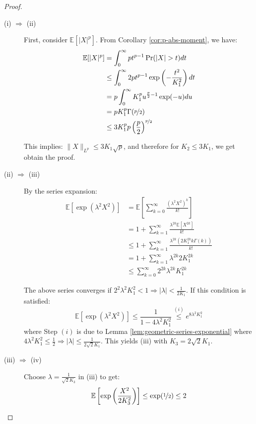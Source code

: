 \documentclass{article}
\theoremstyle{remark}
\newcommand{\Exp}{\mathbb{E}}
\begin{document}
\begin{proof}
\begin{description}
\item [(i) \(\Rightarrow\) (ii)] First, consider \(\Exp[|X|^{p}]\). From Corollary \ref{cor:p-abs-moment}, we have:
\begin{align*}
\Exp[|X|^{p}] &= \int_{0}^{\infty} pt^{p-1} \Pr(|X| > t) dt \\
&\leq \int_{0}^{\infty} 2pt^{p-1} \exp\left(-\frac{t^{2}}{K_{1}^{2}}\right) dt \\
&= p \int_{0}^{\infty} K_{1}^{p}u^{\frac{p}{2} - 1} \exp(-u) du \\
&= p K_{1}^{p} \Gamma(\nicefrac{p}{2}) \\
&\leq 3K_{1}^{p}p\left(\frac{p}{2}\right)^{\nicefrac{p}{2}}
\end{align*}

This implies: \(\|X\|_{L^{p}} \leq 3K_{1}\sqrt{p}\), and therefore for \(K_{2} \leq 3K_{1}\), we get obtain the proof.

\item [(ii) \(\Rightarrow\) (iii)] By the series expansion:
\begin{align*}
\Exp\left[\exp(\lambda^{2}X^{2})\right] &= \Exp\left[\sum_{k=0}^{\infty} \frac{(\lambda^{2}X^{2})^{k}}{k!}\right] \\
&= 1 + \sum_{k=1}^{\infty} \frac{\lambda^{2k}\Exp[X^{2k}]}{k!} \\
&\leq 1 + \sum_{k=1}^{\infty} \frac{\lambda^{2k}(2K_{1}^{2k}k\Gamma(k))}{k!} \\
&= 1 + \sum_{k=1}^{\infty} \lambda^{2k}2K_{1}^{2k} \\
&\leq \sum_{k=0}^{\infty} 2^{2k}\lambda^{2k}K_{1}^{2k}
\end{align*}

The above series converges if \(2^{2}\lambda^{2}K_{1}^{2} < 1 \Rightarrow |\lambda| < \frac{1}{2K_{1}}\). If this condition is satisfied:
\begin{equation*}
\Exp\left[\exp(\lambda^{2}X^{2})\right] \leq \frac{1}{1 - 4\lambda^{2}K_{1}^{2}} \overset{(i)}\leq e^{8\lambda^{2}K_{1}^{2}}
\end{equation*}
where Step \((i)\) is due to Lemma \ref{lem:geometric-series-exponential} where \(4\lambda^{2}K_{1}^{2} \leq \frac{1}{2} \Rightarrow |\lambda| \leq \frac{1}{2\sqrt{2}K_{1}}\). This yields (iii) with \(K_{3} = 2\sqrt{2}K_{1}\).

\item [(iii) \(\Rightarrow\) (iv)] Choose \(\lambda = \frac{1}{\sqrt{2}K_{3}}\) in (iii) to get:
\begin{equation*}
\Exp\left[\exp\left(\frac{X^{2}}{2K_{3}^{2}}\right)\right] \leq \exp(\nicefrac{1}{2}) \leq 2
\end{equation*}


\end{description}
\end{proof}
\end{document}
